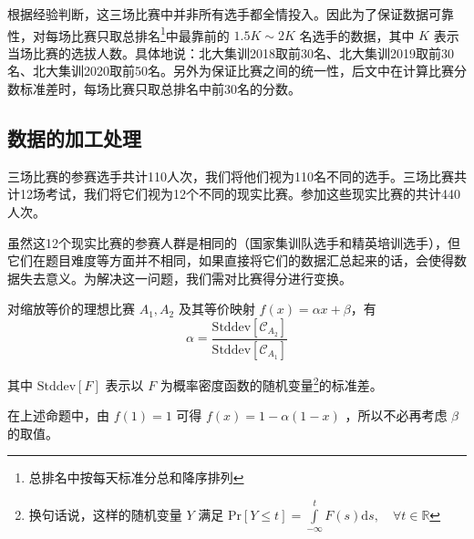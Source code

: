         根据经验判断，这三场比赛中并非所有选手都全情投入。因此为了保证数据可靠性，对每场比赛只取总排名\footnote{总排名中按每天标准分总和降序排列}中最靠前的 $1.5K\sim 2K$ 名选手的数据，其中 $K$ 表示当场比赛的选拔人数。具体地说：北大集训2018取前30名、北大集训2019取前30名、北大集训2020取前50名。另外为保证比赛之间的统一性，后文中在计算比赛分数标准差时，每场比赛只取总排名中前30名的分数。

    \subsection{数据的加工处理}\label{sec:dataPreprocessingOfCTT}

        三场比赛的参赛选手共计110人次，我们将他们视为110名不同的选手。三场比赛共计12场考试，我们将它们视为12个不同的现实比赛。参加这些现实比赛的共计440人次。
        
        虽然这12个现实比赛的参赛人群是相同的（国家集训队选手和精英培训选手），但它们在题目难度等方面并不相同，如果直接将它们的数据汇总起来的话，会使得数据失去意义。为解决这一问题，我们需对比赛得分进行变换。

        \begin{proposition}
            对缩放等价的理想比赛 $A_1,A_2$ 及其等价映射 $f(x)=\alpha x+\beta$\nobreak，有
            $$
            \alpha=\frac{\mathrm{Stddev}\left[\mathcal{C}_{A_2}\right]}{\mathrm{Stddev}\left[\mathcal{C}_{A_1}\right]}
            $$

            其中 $\mathrm{Stddev}\left[F\right]$ 表示以 $F$ 为概率密度函数的随机变量\footnote{换句话说，这样的随机变量 $Y$ 满足 $\mathrm{Pr}\left[Y\leq t\right]=\int\limits_{-\infty}^t F(s)\mathrm{d}s,\quad\forall t\in\mathbb{R}$}的标准差。

            \label{prop:alphaAsQuotientOfStddev}
        \end{proposition}

        在上述命题中，由 $f(1)=1$ 可得 $f(x)=1-\alpha(1-x)$ ，所以不必再考虑 $\beta$ 的取值。

